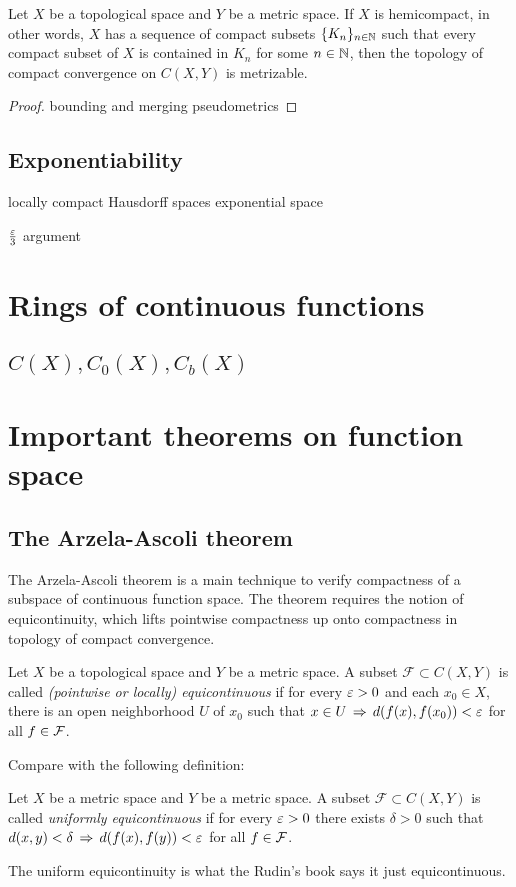 \documentclass{../crs}
\begin{document}
\begin{thm}
Let $X$ be a topological space and $Y$ be a metric space.
If $X$ is hemicompact, in other words, $X$ has a sequence of compact subsets $\{K_n\}_{n\in\mathbb{N}}$ such that every compact subset of $X$ is contained in $K_n$ for some $n\in\mathbb{N}$, then the topology of compact convergence on $C(X,Y)$ is metrizable.
\end{thm}

\begin{proof}
bounding and merging pseudometrics
\end{proof}



\subsection{Exponentiability}
locally compact Hausdorff spaces
exponential space






$\frac{\varepsilon}3$ argument





\section{Rings of continuous functions}
\subsection{$C(X), C_0(X), C_b(X)$}



\section{Important theorems on function space}

\subsection{The Arzela-Ascoli theorem}

The Arzela-Ascoli theorem is a main technique to verify compactness of a subspace of continuous function space.
The theorem requires the notion of equicontinuity, which lifts pointwise compactness up onto compactness in topology of compact convergence.

\begin{defn}
Let $X$ be a topological space and $Y$ be a metric space.
A subset $\mathcal{F}\subset C(X,Y)$ is called \emph{(pointwise or locally) equicontinuous} if for every $\varepsilon>0$ and each $x_0\in X$, there is an open neighborhood $U$ of $x_0$ such that $x\in U\impl d(f(x),f(x_0))<\e$ for all $f\in\mathcal{F}$.
\end{defn}
Compare with the following definition:
\begin{defn}
Let $X$ be a metric space and $Y$ be a metric space.
A subset $\mathcal{F}\subset C(X,Y)$ is called \emph{uniformly equicontinuous} if for every $\varepsilon>0$ there exists $\delta>0$ such that $d(x,y)<\delta\impl d(f(x),f(y))<\e$ for all $f\in\mathcal{F}$.
\end{defn}
The uniform equicontinuity is what the Rudin's book says it just equicontinuous.
\end{document}
